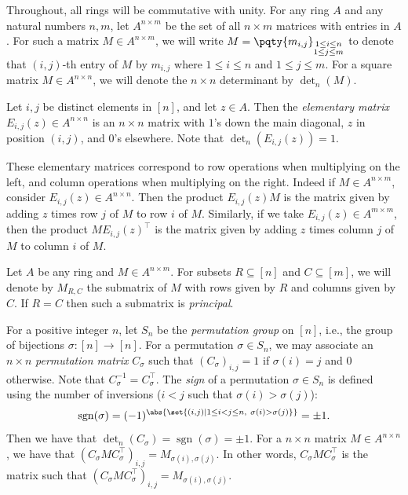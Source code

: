 \documentclass[10pt,a4paper]{amsart}
\newcommand*\ie{i.e.}
\DeclareMathOperator{\sgn}{sgn}
\begin{document}
Throughout, all rings will be commutative with unity.
For any ring $A$ and any natural numbers $n, m$, let $A^{n\times m}$ be the set of all $n\times m$ matrices with entries in $A$.
For such a matrix $M \in A^{n \times m}$, we will write $M = \pqty{m_{i, j}}_{\substack{1 \leq i \leq n \\ 1 \leq j \leq m}}$ to denote that $(i, j)$-th entry of $M$ by $m_{i, j}$ where $1 \leq i \leq n$ and $1 \leq j \leq m$.
For a square matrix $M \in A^{n \times n}$, we will denote the $n \times n$ determinant by $\det_n(M)$.

\begin{defn}\label{defn:elem_mat}
    Let $i,j$ be distinct elements in $[n]$, and let $z \in A$.
    Then the \emph{elementary matrix} $E_{i, j}(z) \in A^{n \times n}$ is an $n \times n$ matrix with $1$'s down the main diagonal, $z$ in position $(i, j)$, and $0$'s elsewhere.
    Note that $\det_n(E_{i, j}(z)) = 1$.

    These elementary matrices correspond to row operations when multiplying on the left, and column operations when multiplying on the right.
    Indeed if $M \in A^{n \times m}$, consider $E_{i, j}(z) \in A^{n \times n}$.
    Then the product $E_{i, j}(z) M$ is the matrix given by adding $z$ times row $j$ of $M$ to row $i$ of $M$.
    Similarly, if we take $E_{i, j}(z) \in A^{m \times m}$, then the product $M E_{i, j}(z)^{\top}$ is the matrix given by adding $z$ times column $j$ of $M$ to column $i$ of $M$.
\end{defn}

Let $A$ be any ring and $M \in A^{n\times m}$.
For subsets $R \subseteq [n]$ and $C \subseteq [m]$, we will denote by $M_{R, C}$ the submatrix of $M$ with rows given by $R$ and columns given by $C$.
If $R = C$ then such a submatrix is \emph{principal}.

For a positive integer $n$, let $S_n$ be the \emph{permutation group} on $[n]$, \ie, the group of bijections $\sigma\colon [n] \to [n]$.
For a permutation $\sigma \in S_n$, we may associate an $n \times n$ \emph{permutation matrix} $C_\sigma$ such that $(C_\sigma)_{i, j} = 1$ if $\sigma(i) = j$ and $0$ otherwise.
Note that $C_\sigma^{-1} = C_\sigma^{\top}$.
The \emph{sign} of a permutation $\sigma \in S_n$ is defined using the number of inversions ($i < j$ such that $\sigma(i) > \sigma(j)$):
\[
  \sgn(\sigma) = (-1)^{\abs{\set{(i, j) \mid 1 \leq i < j \leq n,\ \sigma(i) > \sigma(j)}}} = \pm 1.
\]
Then we have  that $\det_n(C_\sigma) = \sgn(\sigma) = \pm 1$.
For a $n \times n$ matrix $M \in A^{n \times n}$, we have that $(C_\sigma M C_\sigma^{\top})_{i, j} = M_{\sigma(i), \sigma(j)}$.
In other words, $C_\sigma M C_\sigma^{\top}$ is the matrix such that $(C_\sigma M C_\sigma^{\top})_{i, j} = M_{\sigma(i), \sigma(j)}$.
\end{document}
